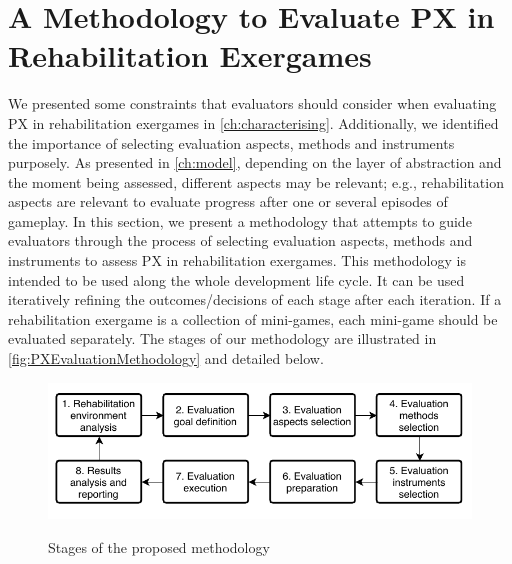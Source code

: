 \chapter{A Methodology to Evaluate PX in Rehabilitation Exergames}
\label{ch:methodology}
We presented some constraints that evaluators should consider when evaluating \ac{PX} in rehabilitation exergames in \autoref{ch:characterising}. Additionally, we identified the importance of selecting evaluation aspects, methods and instruments purposely. As presented in \autoref{ch:model}, depending on the layer of abstraction and the moment being assessed, different aspects may be relevant; e.g., rehabilitation aspects are relevant to evaluate progress after one or several episodes of gameplay. In this section, we present a methodology that attempts to guide evaluators through the process of selecting evaluation aspects, methods and instruments to assess \ac{PX} in rehabilitation exergames. This methodology is intended to be used along the whole development life cycle. It can be used iteratively refining the outcomes/decisions of each stage after each iteration. If a rehabilitation exergame is a collection of mini-games, each mini-game should be evaluated separately. The stages of our methodology are illustrated in \autoref{fig:PXEvaluationMethodology} and detailed below.

\begin{figure}[bth]
\myfloatalign
{\includegraphics[width=\linewidth]{gfx/methodology/PXEvaluationMethodology}} \quad
\caption{Stages of the proposed methodology}\label{fig:PXEvaluationMethodology}
\end{figure}


